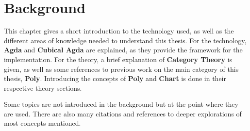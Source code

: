 \chapter{Background}\label{chapter:background}
This chapter gives a short introduction to the technology used, as well as the different areas of knowledge needed to understand this thesis. For the technology, \textbf{Agda} and \textbf{Cubical Agda} are explained, as they provide the framework for the implementation. For the theory, a brief explanation of \textbf{Category Theory} is given, as well as some references to previous work on the main category of this thesis, \textbf{Poly}. Introducing the concepts of \textbf{Poly} and \textbf{Chart} is done in their respective theory sections.

Some topics are not introduced in the background but at the point where they are used. There are also many citations and references to deeper explorations of most concepts mentioned.







